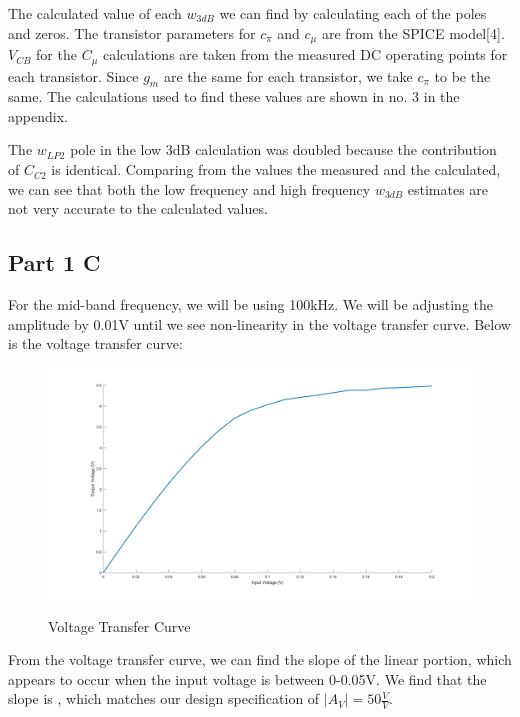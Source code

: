 \documentclass[12pt]{article}
\begin{document}
The calculated value of each $w_{3dB}$ we can find by calculating each of the poles and zeros. The transistor parameters for $c_{\pi}$ and $c_{\mu}$ are from the SPICE model[4]. $V_{CB}$ for the $C_{\mu}$ calculations are taken from the measured DC operating points for each transistor. Since $g_m$ are the same for each transistor, we take $c_\pi$ to be the same. The calculations used to find these values are shown in no. 3 in the appendix. 

\begin{table}[]
\centering
{}
\caption{Calculated Frequencies and Capacitance}
\label{Bias Resistor and Capacitor Values}
\end{table}

The $w_{LP2}$ pole in the low 3dB calculation was doubled because the contribution of $C_{C2}$ is identical.
Comparing from the values the measured and the calculated, we can see that both the low frequency and high frequency $w_{3dB}$ estimates are not very accurate to the calculated values.

\subsection{Part 1 C}

For the mid-band frequency, we will be using 100kHz. We will be adjusting the amplitude by 0.01V until we see non-linearity in the voltage transfer curve. Below is the voltage transfer curve:

\begin{figure}[h!]
\centering
\includegraphics[height=0.31\textwidth]{Images/part_1_voltage_tf.jpg}\\
\caption{Voltage Transfer Curve}
\label{fig:voltagetransfercurve}
\end{figure}
From the voltage transfer curve, we can find the slope of the linear portion, which appears to occur when the input voltage is between 0-0.05V. We find that the slope is , which matches our design specification of $|A_V| = 50\frac{V}{V}$.
\end{document}
